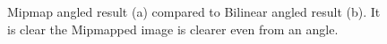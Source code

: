 \documentclass[twocolumn, 12pt]{article}
\begin{document}
    \begingroup
    \begin{figure}
    \captionsetup[subfigure]{justification=centering}
    \centering
    \label{fig:angle}
    \caption{Mipmap angled result (a) compared to Bilinear angled result (b). It is
clear the Mipmapped image  is clearer even from an angle.}
    \hspace{0.1em}%
    \end{figure}
    \endgroup
\end{document}
